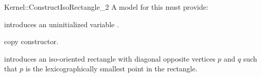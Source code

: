 \begin{ccRefFunctionObjectConcept}{Kernel::ConstructIsoRectangle_2}
A model for this must provide:



\ccHidden {}
             {introduces an uninitialized variable .}

\ccHidden {}
            {copy constructor.}

            {introduces an iso-oriented rectangle  with diagonal
             opposite vertices $p$ and $q$ such that $p$ is the
             lexicographically smallest point in the rectangle.}

\ccSeeAlso
{} \\

\end{ccRefFunctionObjectConcept}
